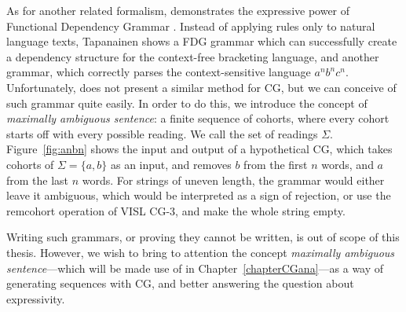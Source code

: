 As for another related formalism, \cite{tapanainen1999phd} demonstrates the expressive power of Functional Dependency Grammar \cite{tapanainen97fdg}.
Instead of applying rules only to natural language texts, Tapanainen shows a FDG grammar which can successfully create a dependency structure for the context-free bracketing language,%
and another grammar, which correctly parses the context-sensitive language $a^nb^nc^n$. 
Unfortunately, \cite{tapanainen1999phd} does not present a similar method for CG, but we can 
conceive of such grammar quite easily. In order to do this, we introduce the concept of \emph{maximally ambiguous sentence}: a finite sequence of cohorts, where every cohort starts off with every possible reading. We call the set of readings $\Sigma$. 
Figure~\ref{fig:anbn} shows the input and output of a hypothetical CG, which takes cohorts
of $\Sigma = \{a, b\}$ as an input, and removes $b$ from the first $n$ words, and $a$ from the last $n$ words. For strings of uneven length, the grammar would either leave it ambiguous, which would be interpreted as a sign of rejection, or use the {\sc remcohort} operation of VISL CG-3, and make the whole string empty.

Writing such grammars, or proving they cannot be written, is out of scope of this thesis.
However, we wish to bring to attention the concept \emph{maximally ambiguous sentence}---which 
will be made use of in Chapter~\ref{chapterCGana}---as a way of generating sequences with CG,
and better answering the question about expressivity.

